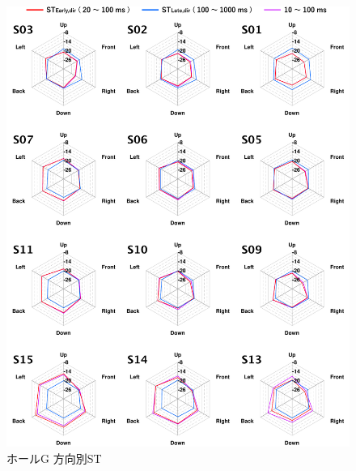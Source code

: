 \documentclass[11pt,a4j]{jreport}
\begin{document}
\newpage

\begin{figure}[H]
  \centering
  \includegraphics[scale=.77]{images/realHallDirSt/allPoint/reshaped/gRightPage.pdf}
  \caption*{ホールG 方向別ST}
\end{figure}


\clearpage



\end{document}
